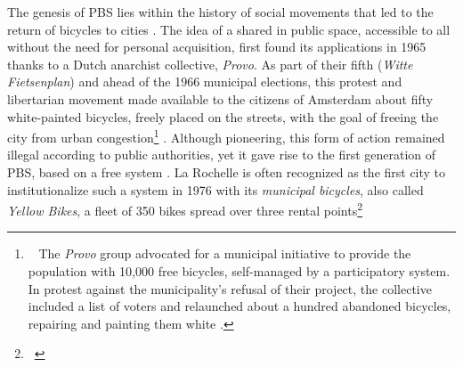 \begin{refsegment}
The genesis of \acrshort{PBS} lies within the history of social movements that led to the return of bicycles to cities \textcolor{blue}{\autocite[23]{hure_mobilites_2019}}. The idea of a  shared in public space, accessible to all without the need for personal acquisition, first found its applications in 1965 thanks to a Dutch anarchist collective, \textsl{Provo}. As part of their fifth  (\textsl{Witte Fietsenplan}) and ahead of the 1966 municipal elections, this protest and libertarian movement made available to the citizens of Amsterdam about fifty white-painted bicycles, freely placed on the streets, with the goal of freeing the city from urban congestion\footnote{~
    The \textsl{Provo} group advocated for a municipal initiative to provide the population with 10,000 free bicycles, self-managed by a participatory system. In protest against the municipality's refusal of their project, the collective included a list of voters and relaunched about a hundred abandoned bicycles, repairing and painting them white \textcolor{blue}{\autocite[29]{hure_mobilites_2019}}.
} \textcolor{blue}{\autocites[6]{smart_provo_2012}{demain_la_ville_doit-velib_2018}}. Although pioneering, this form of action remained illegal according to public authorities, yet it gave rise to the first generation of \acrshort{PBS}, based on a free system \textcolor{blue}{\autocite[160]{shaheen_bikesharing_2010}}. La Rochelle is often recognized as the first city to institutionalize such a system in 1976 with its \textsl{municipal bicycles}, also called \textsl{Yellow Bikes}, a fleet of 350 bikes spread over three rental points\footnote{~
}
\end{refsegment}
